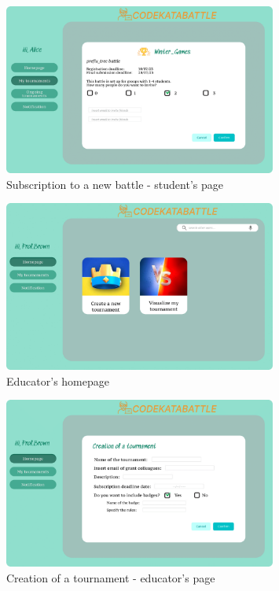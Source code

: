 \begin{figure}[H]
    \centering
    \includegraphics[width=0.8\textwidth]{images/user_interface/UI_sw2-09.png}
    \caption{Subscription to a new battle - student's page}
\end{figure}

\begin{figure}[H]
    \centering
    \includegraphics[width=0.8\textwidth]{images/user_interface/UI_sw2-10.png}
    \caption{Educator's homepage}
\end{figure}

\begin{figure}[H]
    \centering
    \includegraphics[width=0.8\textwidth]{images/user_interface/UI_sw2-11.png}
    \caption{Creation of a tournament - educator's page}
\end{figure}

